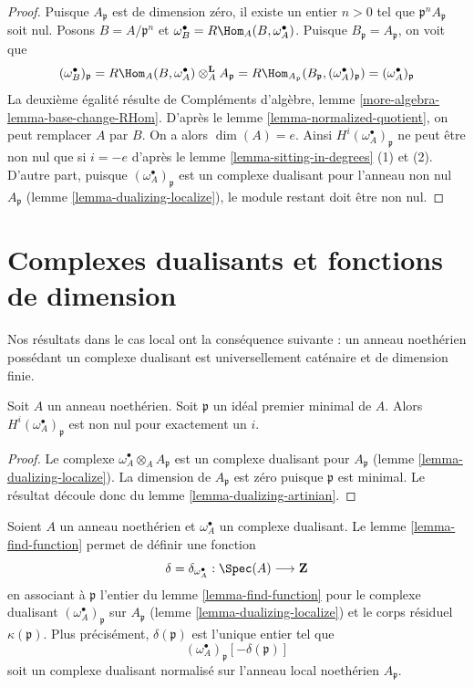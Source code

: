 \begin{proof}
Puisque $A_\mathfrak p$ est de dimension zéro, il existe un entier $n > 0$
tel que $\mathfrak p^nA_\mathfrak p$ soit nul. Posons $B = A/\mathfrak p^n$ et $\omega_B^\bullet = R\Hom_A(B, \omega_A^\bullet)$.
Puisque $B_\mathfrak p = A_\mathfrak p$, on voit que
$$
(\omega_B^\bullet)_\mathfrak p =
R\Hom_A(B, \omega_A^\bullet) \otimes_A^\mathbf{L} A_\mathfrak p =
R\Hom_{A_\mathfrak p}(B_\mathfrak p, (\omega_A^\bullet)_\mathfrak p) =
(\omega_A^\bullet)_\mathfrak p
$$
La deuxième égalité résulte de Compléments d'algèbre, lemme \ref{more-algebra-lemma-base-change-RHom}.
D'après le lemme \ref{lemma-normalized-quotient}, on peut remplacer $A$ par $B$.
On a alors $\dim(A) = e$. Ainsi $H^i(\omega_A^\bullet)_\mathfrak p$ ne peut être non nul que si $i = -e$
d'après le lemme \ref{lemma-sitting-in-degrees} (1) et (2).
D'autre part, puisque $(\omega_A^\bullet)_\mathfrak p$ est un complexe dualisant
pour l'anneau non nul $A_\mathfrak p$ (lemme \ref{lemma-dualizing-localize}),
le module restant doit être non nul.
\end{proof}





\section{Complexes dualisants et fonctions de dimension}
\label{section-dimension-function}

\noindent
Nos résultats dans le cas local ont la conséquence suivante :
un anneau noethérien possédant un complexe dualisant est
universellement caténaire et de dimension finie.

\begin{lemma}
\label{lemma-nonvanishing-generically}
Soit $A$ un anneau noethérien. Soit $\mathfrak p$ un idéal premier minimal de $A$.
Alors $H^i(\omega_A^\bullet)_\mathfrak p$ est non nul pour exactement un $i$.
\end{lemma}

\begin{proof}
Le complexe $\omega_A^\bullet \otimes_A A_\mathfrak p$ est un complexe dualisant pour $A_\mathfrak p$
(lemme \ref{lemma-dualizing-localize}). La dimension de $A_\mathfrak p$ est zéro puisque $\mathfrak p$ est minimal.
Le résultat découle donc du lemme \ref{lemma-dualizing-artinian}.
\end{proof}

\noindent
Soient $A$ un anneau noethérien et $\omega_A^\bullet$ un complexe dualisant.
Le lemme \ref{lemma-find-function} permet de définir une fonction
$$
\delta = \delta_{\omega_A^\bullet} : \Spec(A) \longrightarrow \mathbf{Z}
$$
en associant à $\mathfrak p$ l'entier du lemme \ref{lemma-find-function}
pour le complexe dualisant $(\omega_A^\bullet)_\mathfrak p$ sur $A_\mathfrak p$
(lemme \ref{lemma-dualizing-localize}) et le corps résiduel $\kappa(\mathfrak p)$.
Plus précisément, $\delta(\mathfrak p)$ est l'unique entier tel que
$$
(\omega_A^\bullet)_\mathfrak p[-\delta(\mathfrak p)]
$$
soit un complexe dualisant normalisé sur l'anneau local noethérien $A_\mathfrak p$.


